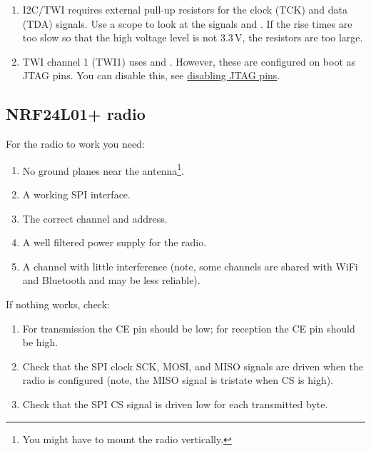 \begin{enumerate}
\item
  I2C/TWI requires external pull-up resistors for the clock (TCK) and
  data (TDA) signals.  Use a scope to look at the signals
   and .  If the rise times are too slow so
  that the high voltage level is not 3.3\,V, the resistors are too
  large.
\item
  TWI channel 1 (TWI1) uses  and . However, these
  are configured on boot as JTAG pins. You can disable this, see
  \hyperref[disabling-jtag-pins]{disabling JTAG pins}.
\end{enumerate}




\subsection{NRF24L01+ radio}
\label{nrf24l01-radio}

For the radio to work you need:

\begin{enumerate}
\item No ground planes near the antenna\footnote{You might have to
  mount the radio vertically.}.
\item
  A working SPI interface.
\item
  The correct channel and address.
\item
  A well filtered power supply for the radio.
\item
  A channel with little interference (note, some channels are shared
  with WiFi and Bluetooth and may be less reliable).
\end{enumerate}

If nothing works, check:

\begin{enumerate}
\item
  For transmission the CE pin should be low; for reception the CE pin
  should be high.
\item
  Check that the SPI clock SCK, MOSI, and MISO signals are driven when
  the radio is configured (note, the MISO signal is tristate when CS is
  high).
\item
  Check that the SPI CS signal is driven low for each transmitted byte.
\end{enumerate}

